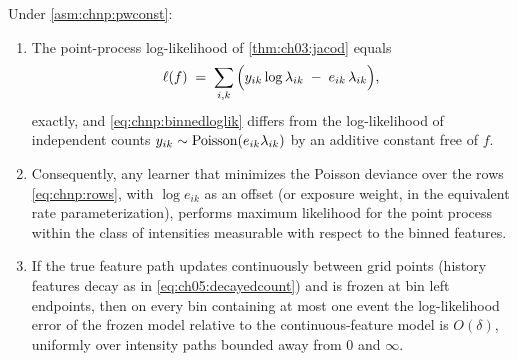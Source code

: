 \begin{proposition}\label{prop:chnp:binned}
Under \cref{asm:chnp:pwconst}:
\begin{enumerate}[label=(\roman*)]
\item The point-process log-likelihood of \cref{thm:ch03:jacod} equals
\begin{equation}\label{eq:chnp:binnedloglik}
\ell(f)
 \;=\;
 \sum_{i,k} \Big( y_{ik} \log \lambda_{ik} \;-\; e_{ik}\, \lambda_{ik} \Big),
\end{equation}
exactly, and \cref{eq:chnp:binnedloglik} differs from the log-likelihood
of independent counts $y_{ik} \sim \mathrm{Poisson}(e_{ik}\lambda_{ik})$ by
an additive constant free of $f$.
\item Consequently, any learner that minimizes the Poisson deviance over
the rows \cref{eq:chnp:rows}, with $\log e_{ik}$ as an offset (or
exposure weight, in the equivalent rate parameterization), performs
maximum likelihood for the point process within the class of intensities
measurable with respect to the binned features.
\item If the true feature path updates continuously between grid points
(history features decay as in \cref{eq:ch05:decayedcount}) and is frozen
at bin left endpoints, then on every bin containing at most one event
the log-likelihood error of the frozen model relative to the
continuous-feature model is $O(\delta)$, uniformly over intensity paths
bounded away from $0$ and $\infty$.
\end{enumerate}
\end{proposition}

